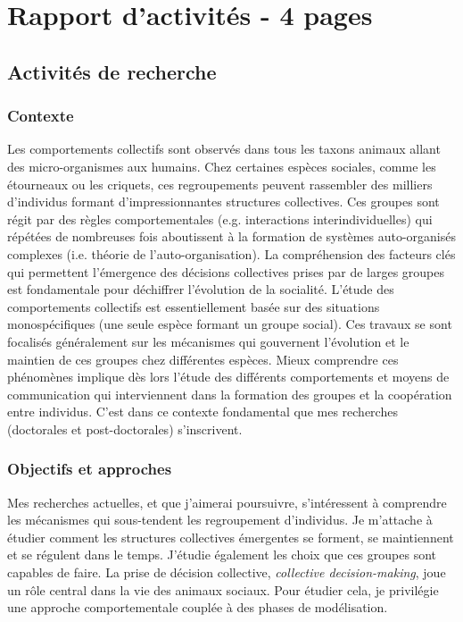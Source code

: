 \documentclass[a4paper,11pt,fleqn]{book} %
\begin{document}

\chapter{Rapport d'activités - 4 pages}
\clearpage

\section{Activités de recherche}
\subsection{Contexte}
Les comportements collectifs sont observés dans tous les taxons animaux allant des micro-organismes aux humains. Chez certaines espèces sociales, comme les étourneaux ou les criquets, ces regroupements peuvent rassembler des milliers d’individus formant d’impressionnantes structures collectives. Ces groupes sont régit par des règles comportementales (e.g. interactions interindividuelles) qui répétées de nombreuses fois aboutissent à la formation de systèmes auto-organisés complexes (i.e. théorie de l’auto-organisation). La compréhension des facteurs clés qui permettent l’émergence des décisions collectives prises par de larges groupes est fondamentale pour déchiffrer l’évolution de la socialité. L’étude des comportements collectifs est essentiellement basée sur des situations monospécifiques (une seule espèce formant un groupe social). Ces travaux se sont focalisés généralement sur les mécanismes qui gouvernent l’évolution et le maintien de ces groupes chez différentes espèces. Mieux comprendre ces phénomènes implique dès lors l’étude des différents comportements et moyens de communication qui interviennent dans la formation des groupes et la coopération entre individus. C’est dans ce contexte fondamental que mes recherches (doctorales et post-doctorales) s’inscrivent.

\subsection{Objectifs et approches}
Mes recherches actuelles, et que j’aimerai poursuivre, s’intéressent à comprendre les mécanismes qui sous-tendent les regroupement d’individus. Je m’attache à étudier comment les structures collectives émergentes se forment, se maintiennent et se régulent dans le temps. J'étudie également les choix que ces groupes sont capables de faire. La prise de décision collective, \textit{collective decision-making}, joue un rôle central dans la vie des animaux sociaux. Pour étudier cela, je privilégie une approche comportementale couplée à des phases de modélisation.
\end{document}

